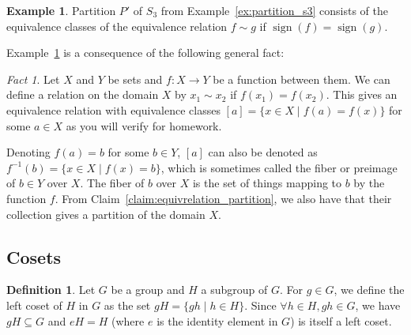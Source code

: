 \documentclass[12pt,letterpaper,DIV=11,final]{scrartcl}
\theoremstyle{plain}
\theoremstyle{definition}
\newtheorem{definition}{Definition}[section]
\newtheorem{example}{Example}[section]
\theoremstyle{remark}
\newtheorem*{fact}{Fact}
\DeclareMathOperator{\sign}{sign}
\begin{document}
\begin{example}\label{ex:equivclass_s3sign}
  Partition $P'$ of $S_3$ from Example~\ref{ex:partition_s3} consists of the equivalence classes of the equivalence relation $f \sim g$ if $\sign(f) = \sign(g)$.
\end{example}

Example~\ref{ex:equivclass_s3sign} is a consequence of the following general fact:
\begin{fact}
  Let $X$ and $Y$ be sets and $f : X \to Y$ be a function between them.
  We can define a relation on the domain $X$ by $x_1 \sim x_2$ if $f(x_1) = f(x_2)$.
  This gives an equivalence relation with equivalence classes $[a] = \{ x \in X \mid f(a) = f(x) \}$ for some $a \in X$ as you will verify for homework.

  Denoting $f(a) = b$ for some $b \in Y$, $[a]$ can also be denoted as $f^{-1}(b) = \{ x \in X \mid f(x) = b \}$, which is sometimes called the fiber or preimage of $b \in Y$ over $X$.
  The fiber of $b$ over $X$ is the set of things mapping to $b$ by the function $f$.
  From Claim~\ref{claim:equivrelation_partition}, we also have that their collection gives a partition of the domain $X$.
\end{fact}

\subsection{Cosets}
\begin{definition}
  Let $G$ be a group and $H$ a subgroup of $G$.
  For $g \in G$, we define the left coset of $H$ in $G$ as the set $gH = \{ gh \mid h \in H \}$.
  Since $\forall h \in H, gh \in G$, we have $gH \subseteq G$ and $eH = H$ (where $e$ is the identity element in $G$) is itself a left coset.
\end{definition}
\end{document}
